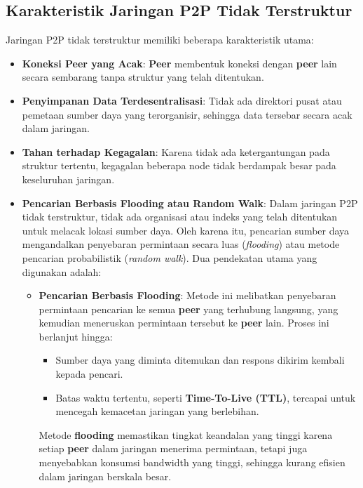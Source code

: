 \subsection{Karakteristik Jaringan P2P Tidak Terstruktur}
Jaringan P2P tidak terstruktur memiliki beberapa karakteristik utama:
\begin{itemize}
	\item \textbf{Koneksi Peer yang Acak}: \textbf{Peer} membentuk koneksi dengan \textbf{peer} lain secara sembarang tanpa struktur yang telah ditentukan.
	\item \textbf{Penyimpanan Data Terdesentralisasi}: Tidak ada direktori pusat atau pemetaan sumber daya yang terorganisir, sehingga data tersebar secara acak dalam jaringan.
	\item \textbf{Tahan terhadap Kegagalan}: Karena tidak ada ketergantungan pada struktur tertentu, kegagalan beberapa node tidak berdampak besar pada keseluruhan jaringan.
	\item \textbf{Pencarian Berbasis Flooding atau Random Walk}: Dalam jaringan P2P tidak terstruktur, tidak ada organisasi atau indeks yang telah ditentukan untuk melacak lokasi sumber daya. Oleh karena itu, pencarian sumber daya mengandalkan penyebaran permintaan secara luas (\textit{flooding}) atau metode pencarian probabilistik (\textit{random walk}). Dua pendekatan utama yang digunakan adalah:
	\begin{itemize}
		\item \textbf{Pencarian Berbasis Flooding}: Metode ini melibatkan penyebaran permintaan pencarian ke semua \textbf{peer} yang terhubung langsung, yang kemudian meneruskan permintaan tersebut ke \textbf{peer} lain. Proses ini berlanjut hingga:
		\begin{itemize}
			\item Sumber daya yang diminta ditemukan dan respons dikirim kembali kepada pencari.
			\item Batas waktu tertentu, seperti \textbf{Time-To-Live (TTL)}, tercapai untuk mencegah kemacetan jaringan yang berlebihan.
		\end{itemize}
		Metode \textbf{flooding} memastikan tingkat keandalan yang tinggi karena setiap \textbf{peer} dalam jaringan menerima permintaan, tetapi juga menyebabkan konsumsi bandwidth yang tinggi, sehingga kurang efisien dalam jaringan berskala besar.
		

\end{itemize}
\end{itemize}
